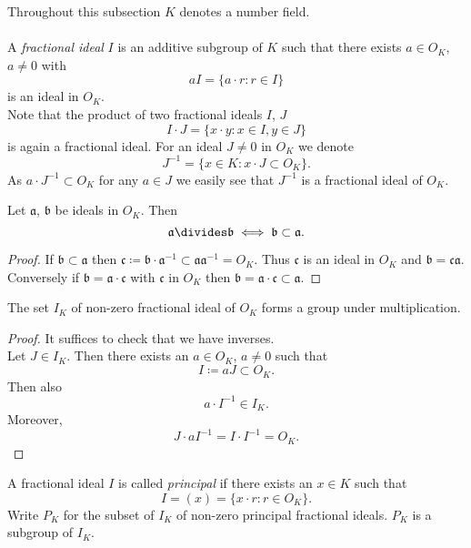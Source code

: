 \documentclass[NumTh.tex]{subfiles}
\begin{document}
Throughout this subsection $K$ denotes a number field.\\
\\
A \emph{fractional ideal} $I$ is an additive subgroup of $K$ such that there exists $a \in O_K$, $a \neq 0$ with
\[ aI = \{ a \cdot r : r \in I \} \]
is an ideal in $O_K$.\\
Note that the product of two fractional ideals $I$, $J$
\[ I \cdot J = \{ x \cdot y : x \in I, y \in J \} \]
is again a fractional ideal.
For an ideal $J \neq 0$ in $O_K$ we denote
\[ J^{-1} = \{ x \in K : x \cdot J \subset O_K \} \text{.} \]
As $a \cdot J^{-1} \subset O_K$ for any $a \in J$ we easily see that $J^{-1}$ is a fractional ideal of $O_K$.

\begin{lemma}
  Let $\mathfrak{a}$, $\mathfrak{b}$ be ideals in $O_K$.
  Then 
  \[ \mathfrak{a} \divides \mathfrak{b} \iff \mathfrak{b} \subset \mathfrak{a} \text{.} \]
\end{lemma}

\begin{proof}
  If $\mathfrak{b} \subset \mathfrak{a}$ then $\mathfrak{c} \coloneq \mathfrak{b} \cdot \mathfrak{a}^{-1} \subset \mathfrak{a} \mathfrak{a}^{-1} = O_K$.
  Thus $\mathfrak{c}$ is an ideal in $O_K$ and $\mathfrak{b} = \mathfrak{c} \mathfrak{a}$.
  Conversely if $\mathfrak{b} = \mathfrak{a} \cdot \mathfrak{c}$ with $\mathfrak{c}$ in $O_K$ then $\mathfrak{b} = \mathfrak{a} \cdot \mathfrak{c} \subset \mathfrak{a}$.
\end{proof}

\begin{lemma}\label{l_3_4_2}
  The set $I_K$ of non-zero fractional ideal of $O_K$ forms a group under multiplication.
\end{lemma}

\begin{proof}
  It suffices to check that we have inverses.\\
  Let $J \in I_K$.
  Then there exists an $a \in O_K$, $a \neq 0$ such that 
  \[ I \coloneq a J \subset O_K \text{.} \]
  Then also
  \[ a \cdot I^{-1} \in I_K \text{.} \]
  Moreover,
  \[ J \cdot a I^{-1} = I \cdot I^{-1} = O_K \text{.} \]
\end{proof}

A fractional ideal $I$ is called \emph{principal} if there exists an $x \in K$ such that 
\[ I = (x) = \{ x \cdot r: r \in O_K \} \text{.} \]
Write $P_K$ for the subset of $I_K$ of non-zero principal fractional ideals.
$P_K$ is a subgroup of $I_K$.
\end{document}
